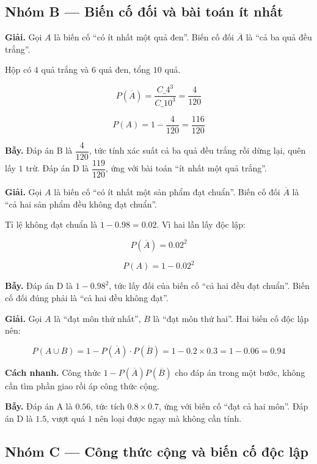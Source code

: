 \documentclass[11pt, a4paper]{article}
\begin{document}
\subsection*{Nhóm B — Biến cố đối và bài toán ít nhất}

\begin{dapan}[8 — Đáp án C]
\textbf{Giải.} Gọi $A$ là biến cố “có ít nhất một quả đen”. Biến cố đối $\overline{A}$ là “cả ba quả đều trắng”.

Hộp có $4$ quả trắng và $6$ quả đen, tổng $10$ quả.

$$P(\overline{A}) = \frac{C\_4^3}{C\_{10}^3} = \frac{4}{120}$$

$$P(A) = 1 - \frac{4}{120} = \frac{116}{120}$$

\textbf{Bẫy.} Đáp án B là $\dfrac{4}{120}$, tức tính xác suất cả ba quả đều trắng rồi dừng lại, quên lấy $1$ trừ. Đáp án D là $\dfrac{119}{120}$, ứng với bài toán “ít nhất một quả trắng”.
\end{dapan}

\begin{dapan}[9 — Đáp án A]
\textbf{Giải.} Gọi $A$ là biến cố “có ít nhất một sản phẩm đạt chuẩn”. Biến cố đối $\overline{A}$ là “cả hai sản phẩm đều không đạt chuẩn”.

Tỉ lệ không đạt chuẩn là $1 - 0.98 = 0.02$. Vì hai lần lấy độc lập:

$$P(\overline{A}) = 0.02^2$$

$$P(A) = 1 - 0.02^2$$

\textbf{Bẫy.} Đáp án D là $1 - 0.98^2$, tức lấy đối của biến cố “cả hai đều đạt chuẩn”. Biến cố đối đúng phải là “cả hai đều không đạt”.
\end{dapan}

\begin{dapan}[10 — Đáp án B]
\textbf{Giải.} Gọi $A$ là “đạt môn thứ nhất”, $B$ là “đạt môn thứ hai”. Hai biến cố độc lập nên:

$$P(A \cup B) = 1 - P(\overline{A}) \cdot P(\overline{B}) = 1 - 0.2 \times 0.3 = 1 - 0.06 = 0.94$$

\textbf{Cách nhanh.} Công thức $1 - P(\overline{A}) P(\overline{B})$ cho đáp án trong một bước, không cần tìm phần giao rồi áp công thức cộng.

\textbf{Bẫy.} Đáp án A là $0.56$, tức tích $0.8 \times 0.7$, ứng với biến cố “đạt cả hai môn”. Đáp án D là $1.5$, vượt quá $1$ nên loại được ngay mà không cần tính.
\end{dapan}

\subsection*{Nhóm C — Công thức cộng và biến cố độc lập}
\end{document}
